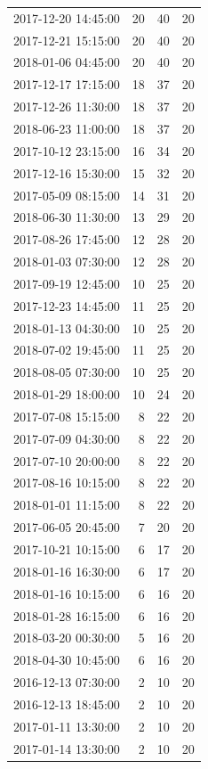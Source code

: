 \begin{tabular}{lrrr}
2017-12-20 14:45:00 & 20 & 40 & 20 \\
2017-12-21 15:15:00 & 20 & 40 & 20 \\
2018-01-06 04:45:00 & 20 & 40 & 20 \\
2017-12-17 17:15:00 & 18 & 37 & 20 \\
2017-12-26 11:30:00 & 18 & 37 & 20 \\
2018-06-23 11:00:00 & 18 & 37 & 20 \\
2017-10-12 23:15:00 & 16 & 34 & 20 \\
2017-12-16 15:30:00 & 15 & 32 & 20 \\
2017-05-09 08:15:00 & 14 & 31 & 20 \\
2018-06-30 11:30:00 & 13 & 29 & 20 \\
2017-08-26 17:45:00 & 12 & 28 & 20 \\
2018-01-03 07:30:00 & 12 & 28 & 20 \\
2017-09-19 12:45:00 & 10 & 25 & 20 \\
2017-12-23 14:45:00 & 11 & 25 & 20 \\
2018-01-13 04:30:00 & 10 & 25 & 20 \\
2018-07-02 19:45:00 & 11 & 25 & 20 \\
2018-08-05 07:30:00 & 10 & 25 & 20 \\
2018-01-29 18:00:00 & 10 & 24 & 20 \\
2017-07-08 15:15:00 & 8 & 22 & 20 \\
2017-07-09 04:30:00 & 8 & 22 & 20 \\
2017-07-10 20:00:00 & 8 & 22 & 20 \\
2017-08-16 10:15:00 & 8 & 22 & 20 \\
2018-01-01 11:15:00 & 8 & 22 & 20 \\
2017-06-05 20:45:00 & 7 & 20 & 20 \\
2017-10-21 10:15:00 & 6 & 17 & 20 \\
2018-01-16 16:30:00 & 6 & 17 & 20 \\
2018-01-16 10:15:00 & 6 & 16 & 20 \\
2018-01-28 16:15:00 & 6 & 16 & 20 \\
2018-03-20 00:30:00 & 5 & 16 & 20 \\
2018-04-30 10:45:00 & 6 & 16 & 20 \\
2016-12-13 07:30:00 & 2 & 10 & 20 \\
2016-12-13 18:45:00 & 2 & 10 & 20 \\
2017-01-11 13:30:00 & 2 & 10 & 20 \\
2017-01-14 13:30:00 & 2 & 10 & 20 \\

\end{tabular}
